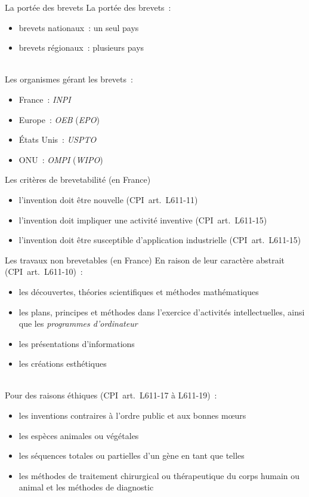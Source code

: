 \documentclass{beamer}
\begin{document}
\begin{frame}{La portée des brevets}
    La portée des brevets~:
    \begin{itemize}
        \item brevets nationaux~: un seul pays
        \item brevets régionaux~: plusieurs pays
    \end{itemize}
    ~\\
    Les organismes gérant les brevets~:
    \begin{itemize}
        \item France~: \emph{INPI}
        \item Europe~: \emph{OEB} (\emph{EPO})
        \item États Unis~: \emph{USPTO}
        \item ONU~: \emph{OMPI} (\emph{WIPO})
    \end{itemize}
\end{frame}

\begin{frame}{Les critères de brevetabilité (en France)}
    \begin{itemize}
        \item l’invention doit être nouvelle (CPI~art.~L611-11)
        \item l’invention doit impliquer une activité inventive
              (CPI~art.~L611-15)
        \item l’invention doit être susceptible d’application industrielle
              (CPI~art.~L611-15)
    \end{itemize}
\end{frame}

\begin{frame}{Les travaux non brevetables (en France)}
    En raison de leur caractère abstrait (CPI~art.~L611-10)~:
    \begin{itemize}
        \item les découvertes, théories scientifiques et méthodes
              mathématiques
        \item les plans, principes et méthodes dans l’exercice d’activités
              intellectuelles, ainsi que les \emph{programmes d’ordinateur}
        \item les présentations d’informations
        \item les créations esthétiques
    \end{itemize}
    ~\\
    Pour des raisons éthiques (CPI~art.~L611-17 à L611-19)~:
    \begin{itemize}
        \item les inventions contraires à l’ordre public et aux bonnes mœurs
        \item les espèces animales ou végétales
        \item les séquences totales ou partielles d'un gène en tant que telles
        \item les méthodes de traitement chirurgical ou thérapeutique du
              corps humain ou animal et les méthodes de diagnostic
    \end{itemize}
\end{frame}
\end{document}
